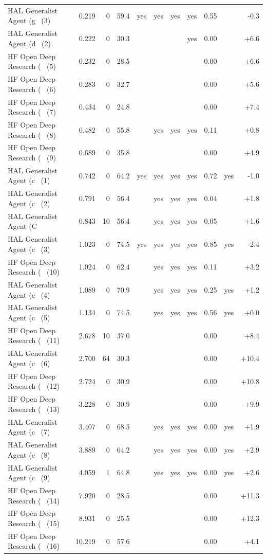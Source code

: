 {\begin{longtable}{lrrrcccccrr}
HAL Generalist Agent (g~ (3) & 0.219 & 0 & 59.4 & yes & yes & yes & yes & 0.55 &  & -0.3 \\
HAL Generalist Agent (d~ (2) & 0.222 & 0 & 30.3 &  &  &  & yes & 0.00 &  & +6.6 \\
HF Open Deep Research (~ (5) & 0.232 & 0 & 28.5 &  &  &  &  & 0.00 &  & +6.6 \\
HF Open Deep Research (~ (6) & 0.283 & 0 & 32.7 &  &  &  &  & 0.00 &  & +5.6 \\
HF Open Deep Research (~ (7) & 0.434 & 0 & 24.8 &  &  &  &  & 0.00 &  & +7.4 \\
HF Open Deep Research (~ (8) & 0.482 & 0 & 55.8 &  & yes & yes & yes & 0.11 &  & +0.8 \\
HF Open Deep Research (~ (9) & 0.689 & 0 & 35.8 &  &  &  &  & 0.00 &  & +4.9 \\
HAL Generalist Agent (c~ (1) & 0.742 & 0 & 64.2 & yes & yes & yes & yes & 0.72 & yes & -1.0 \\
HAL Generalist Agent (c~ (2) & 0.791 & 0 & 56.4 &  & yes & yes & yes & 0.04 &  & +1.8 \\
HAL Generalist Agent (C~ & 0.843 & 10 & 56.4 &  & yes & yes & yes & 0.05 &  & +1.6 \\
HAL Generalist Agent (c~ (3) & 1.023 & 0 & 74.5 & yes & yes & yes & yes & 0.85 & yes & -2.4 \\
HF Open Deep Research (~ (10) & 1.024 & 0 & 62.4 &  & yes & yes & yes & 0.11 &  & +3.2 \\
HAL Generalist Agent (c~ (4) & 1.089 & 0 & 70.9 &  & yes & yes & yes & 0.25 & yes & +1.2 \\
HAL Generalist Agent (c~ (5) & 1.134 & 0 & 74.5 &  & yes & yes & yes & 0.56 & yes & +0.0 \\
HF Open Deep Research (~ (11) & 2.678 & 10 & 37.0 &  &  &  &  & 0.00 &  & +8.4 \\
HAL Generalist Agent (c~ (6) & 2.700 & 64 & 30.3 &  &  &  &  & 0.00 &  & +10.4 \\
HF Open Deep Research (~ (12) & 2.724 & 0 & 30.9 &  &  &  &  & 0.00 &  & +10.8 \\
HF Open Deep Research (~ (13) & 3.228 & 0 & 30.9 &  &  &  &  & 0.00 &  & +9.9 \\
HAL Generalist Agent (c~ (7) & 3.407 & 0 & 68.5 &  & yes & yes & yes & 0.00 & yes & +1.9 \\
HAL Generalist Agent (c~ (8) & 3.889 & 0 & 64.2 &  & yes & yes & yes & 0.00 & yes & +2.9 \\
HAL Generalist Agent (c~ (9) & 4.059 & 1 & 64.8 &  & yes & yes & yes & 0.00 & yes & +2.6 \\
HF Open Deep Research (~ (14) & 7.920 & 0 & 28.5 &  &  &  &  & 0.00 &  & +11.3 \\
HF Open Deep Research (~ (15) & 8.931 & 0 & 25.5 &  &  &  &  & 0.00 &  & +12.3 \\
HF Open Deep Research (~ (16) & 10.219 & 0 & 57.6 &  &  &  &  & 0.00 &  & +4.1 \\
\end{longtable}

}
